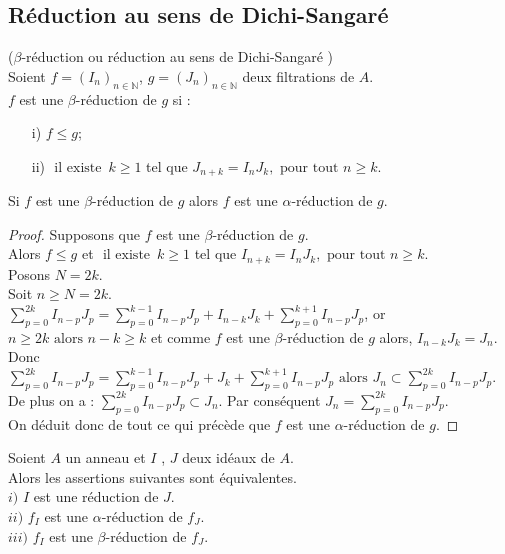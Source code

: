 \subsection{Réduction au sens de Dichi-Sangaré}
\begin{madefinition}
	($\beta$-réduction ou réduction au sens de Dichi-Sangaré \cite{Di4})\\
	Soient $f = (I_n)_{n \in \mathbb{N}}$, $g = (J_n)_{n \in \mathbb{N}}$ deux filtrations de $A$.\\
	$f$ est une $\beta$-réduction de $g$ si : \\
	\begin{enumerate}
		\item[i)] $f \leq g$;
		\item[ii)]  $\text{ il existe } \, k \geq 1$ tel que $J_{n+k} = I_n J_k , \text{ pour tout } n \geq k$.
	\end{enumerate}
\end{madefinition}
\begin{maremarque}
	Si $f$ est une $\beta$-réduction de $g$ alors $f$ est une $\alpha$-réduction de $g$.\\	
\end{maremarque}
\begin{proof}
	Supposons que $f$ est une $\beta$-réduction de $g$.\\
	Alors $f \leq g$ et $\text{ il existe } \, k \geq 1$ tel que $I_{n+k} = I_n J_k , \text{ pour tout } n \geq k$.\\
	Posons $N = 2k$.\\
	Soit $n \geq N= 2k$.\\
	$\displaystyle \sum_{p=0}^{2k}{I_{n-p} J_{p}} = \displaystyle \sum_{p=0}^{k-1}{I_{n-p} J_{p}} + I_{n-k} J_k + \displaystyle \sum_{p=0}^{k+1}{I_{n-p} J_{p}}$, or $n \geq  2k \text{ alors } n-k \geq k$ et comme $f$ est une $\beta$-réduction de $g$ alors, $I_{n-k} J_k = J_n$.\\
	Donc $\displaystyle \sum_{p=0}^{2k}{I_{n-p} J_{p}} = \displaystyle \sum_{p=0}^{k-1}{I_{n-p} J_{p}} + J_k + \displaystyle \sum_{p=0}^{k+1}{I_{n-p} J_{p}} \text{ alors } J_n \subset \displaystyle \sum_{p=0}^{2k}{I_{n-p} J_{p}}$.\\
	De plus on a : $\displaystyle \sum_{p=0}^{2k}{I_{n-p} J_{p}} \subset J_n$. 
	Par conséquent $J_n = \displaystyle \sum_{p=0}^{2k}{I_{n-p} J_{p}}$.\\
	On déduit donc de tout ce qui précède que $f$ est une $\alpha$-réduction de $g$.
\end{proof}
\begin{maproposition}
	Soient $A$ un anneau et $I$ , $J$ deux idéaux de $A$.\\
	Alors les assertions suivantes sont équivalentes.\\
	$i)$ $I$ est une réduction de $J$.\\
	$ii)$ $f_I$ est une $\alpha$-réduction de $f_J$.\\
	$iii)$ $f_I$ est une $\beta$-réduction de $f_J$.
\end{maproposition}
